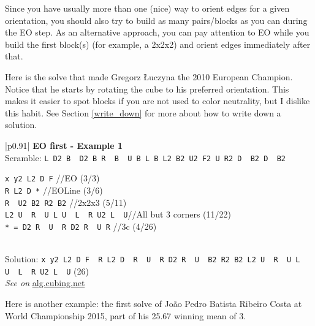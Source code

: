 \documentclass[11pt,a4paper]{book}
\newcommand{\p}{\textquotesingle}
\newcommand{\m}{\texttt}
\newcommand{\ps}{\p\,\,}
\newcommand{\comment}[1]{{\color{gray}\quad//#1}}
\begin{document}
Since you have usually more than one (nice) way to orient edges for a given orientation, you should also try to build as many pairs/blocks as you can during the EO step. As an alternative approach, you can pay attention to EO while you build the first block(s) (for example, a 2x2x2) and orient edges immediately after that.

Here is the solve that made Gregorz Łuczyna the 2010 European Champion. Notice that he starts by rotating the cube to his preferred orientation. This makes it easier to spot blocks if you are not used to color neutrality, but I dislike this habit. See Section \ref{write_down} for more about how to write down a solution.

\bigskip
\begin{tabular}{|p{}|}
\hline
\textbf{EO first - Example 1}\\
\hline
Scramble: \m{L D2 B\ps D2 B R\ps B\ps U B L B L2 B2 U2 F2 U R2 D\ps B2 D\ps B2}\\
\hline
\begin{minipage}[l]{0.650\textwidth}
\m{x y2 L2 D F\p} \comment{EO (3/3)}\\
\m{R L2 D *} \comment{EOLine (3/6)}\\
\m{R\ps U2 B2 R2 B2} \comment{2x2x3 (5/11)}\\
\m{L2 U\ps R\ps U L U\ps L\ps R U2 L\ps U\p}\comment{All but 3 corners (11/22)}\\
\m{* = D2 R\ps U\ps R D2 R\ps U R} \comment{3c (4/26)}
\end{minipage}
\begin{minipage}[c]{0.25\textwidth}

\end{minipage}\\
\hline
Solution: \m{x y2 L2 D F\ps R L2 D\ps R\ps U\ps R D2 R\ps U\ps B2 R2 B2 L2 U\ps R\ps U L U\ps L\ps R U2 L\ps U\p} (26)\\
\hline
\emph{See on }\href{https://alg.cubing.net/?setup=L_D2_B-_D2_B_R-_B-_U_B_L_B_L2_B2_U2_F2_U_R2_D-_B2_D-_B2&alg=x_y2_L2_D_F-_\%2F\%2FEO\%0AR_L2_D_\%2F\%2FEOLine\%0A(D2_R-_U-_R_D2_R-_U_R)_R-_U2_B2_R2_B2_\%2F\%2F2x2x3\%0AL2_U-_R-_U_L_U-_L-_R_U2_L-_U-_\%2F\%2FAll_but_3_corners}{alg.cubing.net}\\
\hline
\end{tabular}
\bigskip

Here is another example: the first solve of João Pedro Batista Ribeiro Costa at World Championship 2015, part of his 25.67 winning mean of 3.
\end{document}
